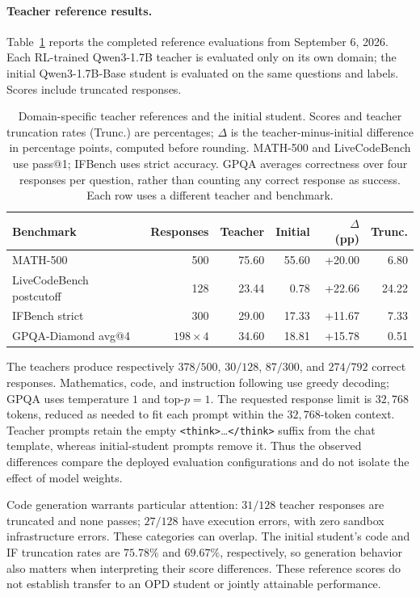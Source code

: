 \paragraph{Teacher reference results.}
Table~\ref{tab:teacher_reference} reports the completed reference evaluations
from September 6, 2026. Each RL-trained Qwen3-1.7B teacher is evaluated only on its
own domain; the initial Qwen3-1.7B-Base student is evaluated on the same
questions and labels. Scores include truncated responses.

\begin{table}[htbp]
\centering
\small
\setlength{\tabcolsep}{4pt}
\begin{tabular}{lrrrrr}
\toprule
Benchmark & Responses & Teacher & Initial & $\Delta$ (pp) & Trunc. \\
\midrule
MATH-500 & 500 & 75.60 & 55.60 & +20.00 & 6.80 \\
LiveCodeBench postcutoff & 128 & 23.44 & 0.78 & +22.66 & 24.22 \\
IFBench strict & 300 & 29.00 & 17.33 & +11.67 & 7.33 \\
GPQA-Diamond avg@4 & $198\times4$ & 34.60 & 18.81 & +15.78 & 0.51 \\
\bottomrule
\end{tabular}
\caption{Domain-specific teacher references and the initial student.
Scores and teacher truncation rates (Trunc.) are percentages;
$\Delta$ is the teacher-minus-initial difference in percentage points,
computed before rounding. MATH-500 and LiveCodeBench use pass@1;
IFBench uses strict accuracy. GPQA averages correctness over four
responses per question, rather than counting any correct response as
success. Each row uses a different teacher and benchmark.}
\label{tab:teacher_reference}
\end{table}

The teachers produce respectively $378/500$, $30/128$, $87/300$, and
$274/792$ correct responses. Mathematics, code, and instruction following
use greedy decoding; GPQA uses temperature $1$ and top-$p=1$.
The requested response limit is $32{,}768$ tokens, reduced as needed to
fit each prompt within the $32{,}768$-token context.
Teacher prompts retain the empty \texttt{<think>}\ldots\texttt{</think>}
suffix from the chat template, whereas initial-student prompts remove
it. Thus the observed differences compare the deployed evaluation
configurations and do not isolate the effect of model weights.

Code generation warrants particular attention: $31/128$ teacher responses
are truncated and none passes; $27/128$ have execution errors, with zero
sandbox infrastructure errors. These categories can overlap.
The initial student's code and IF truncation rates are $75.78\%$ and
$69.67\%$, respectively, so generation behavior also matters when
interpreting their score differences. These reference scores do not
establish transfer to an OPD student or jointly attainable performance.

